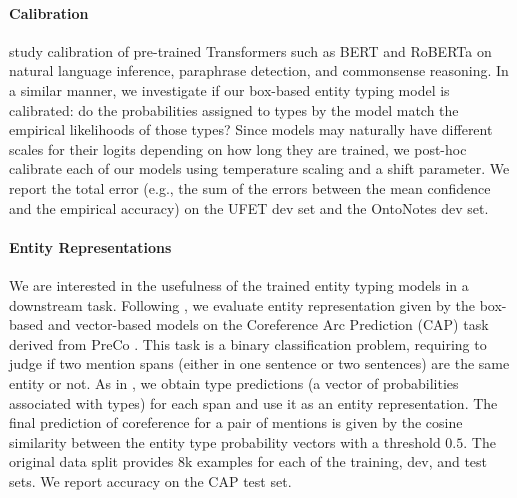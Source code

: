 \documentclass[11pt,a4paper]{article}
\begin{document}
\paragraph{Calibration} \citet{Shrey_Desai_20} study calibration of pre-trained Transformers such as BERT and RoBERTa \citep{Yinhan_Liu_19} on natural language inference, paraphrase detection, and commonsense reasoning. In a similar manner, we investigate if our box-based entity typing model is calibrated: do the probabilities assigned to types by the model match the empirical likelihoods of those types? Since models may naturally have different scales for their logits depending on how long they are trained, we post-hoc calibrate each of our models using temperature scaling \cite{Chuan_Guo_17} and a shift parameter.  We report the total error (e.g., the sum of the errors between the mean confidence and the empirical accuracy) on the UFET dev set and the OntoNotes dev set.


\paragraph{Entity Representations} We are interested in the usefulness of the trained entity typing models in a downstream task. Following \citet{Yasumasa_Onoe_20_Findings}, we evaluate entity representation given by the box-based and vector-based models on the Coreference Arc Prediction (CAP) task \citep{Mingda_Chen_19} derived from PreCo \citep{Hong_Checn_18}. This task is a binary classification problem, requiring to judge if two mention spans (either in one sentence or two sentences) are the same entity or not. As in \citet{Yasumasa_Onoe_20_Findings}, we obtain type predictions (a vector of probabilities associated with types) for each span and use it as an entity representation. The final prediction of coreference for a pair of mentions is given by the cosine similarity between the entity type probability vectors with a threshold $0.5$. The original data split provides 8k examples for each of the training, dev, and test sets. We report accuracy on the CAP test set.
\end{document}
